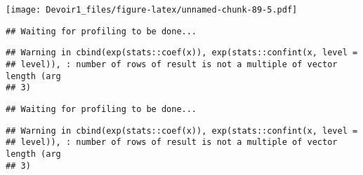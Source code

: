\documentclass[]{article}
\newenvironment{Shaded}{\begin{snugshade}}{\end{snugshade}}
\newcommand{\KeywordTok}[1]{\textcolor[rgb]{0.13,0.29,0.53}{\textbf{#1}}}
\newcommand{\DataTypeTok}[1]{\textcolor[rgb]{0.13,0.29,0.53}{#1}}
\newcommand{\DecValTok}[1]{\textcolor[rgb]{0.00,0.00,0.81}{#1}}
\newcommand{\StringTok}[1]{\textcolor[rgb]{0.31,0.60,0.02}{#1}}
\newcommand{\OperatorTok}[1]{\textcolor[rgb]{0.81,0.36,0.00}{\textbf{#1}}}
\newcommand{\NormalTok}[1]{#1}
\begin{document}
\texttt{[image: Devoir1\_files/figure-latex/unnamed-chunk-89-5.pdf]}

\begin{Shaded}
\end{Shaded}

\begin{verbatim}
## Waiting for profiling to be done...
\end{verbatim}

\begin{verbatim}
## Warning in cbind(exp(stats::coef(x)), exp(stats::confint(x, level =
## level)), : number of rows of result is not a multiple of vector length (arg
## 3)
\end{verbatim}

\begin{verbatim}
## Waiting for profiling to be done...
\end{verbatim}

\begin{verbatim}
## Warning in cbind(exp(stats::coef(x)), exp(stats::confint(x, level =
## level)), : number of rows of result is not a multiple of vector length (arg
## 3)
\end{verbatim}
\end{document}
